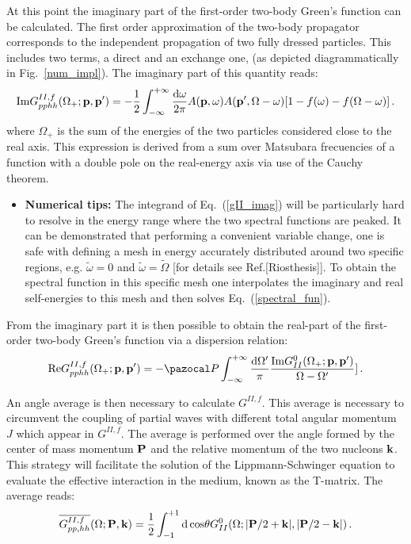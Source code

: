  At this point the imaginary part of the first-order two-body Green's function can be calculated. The first order approximation of the two-body propagator corresponds to the independent propagation of two fully dressed particles. This includes two terms, a direct and an exchange one, (as depicted diagrammatically in Fig.~\ref{num_impl}). The imaginary part of this quantity reads:
\begin{equation}
\label{gII_imag}
{\rm Im}G^{II,f}_{pphh}(\Omega_+;{\bf p},{\bf p'}) = -\frac{1}{2}\int_{-\infty}^{+\infty}\frac{{\rm d}{\omega}}{2\pi}A({\bf p},\omega)A({\bf p'},\Omega-\omega)[1-f(\omega)-f(\Omega-\omega)]\,.
\end{equation}
where $\Omega_+$ is the sum of the energies of the two particles considered close to the real axis. This expression is derived from a sum over Matsubara frecuencies of a function with a double pole on the real-energy axis via use of the Cauchy theorem.
\begin{itemize}
\item {\bf Numerical tips:} The integrand of Eq.~(\ref{gII_imag}) will be particularly hard to resolve in the energy range where the two spectral functions are peaked. It can be demonstrated that performing a convenient variable change, one is safe with defining a mesh in energy accurately distributed around two specific regions, e.g. $\tilde\omega=0$ and $\tilde\omega=\tilde\Omega$ [for details see Ref.[Riosthesis]]. To obtain the spectral function in this specific mesh one interpolates the imaginary and real self-energies to this mesh and then solves Eq.~(\ref{spectral_fun}).
\end{itemize}

 From the imaginary part it is then possible to obtain the real-part of the first-order two-body Green's function via a dispersion relation:
\begin{equation}
{\rm Re}G^{II,f}_{pphh}(\Omega_+;{\bf p},{\bf p'}) = -{\pazocal P}\int_{-\infty}^{+\infty}\frac{{\rm d}{\Omega'}}{\pi}\frac{{\rm Im}G^0_{II}(\Omega_+;{\bf p},{\bf p'})}{\Omega-\Omega'}]\,.
\end{equation}

 An angle average is then necessary to calculate $G^{II,f}$. This average is necessary to circumvent the coupling of partial waves with different total angular momentum $J$ which appear in $G^{II,f}$. The average is performed over the angle formed by the center of mass momentum ${\bf P}$ and the relative momentum of the two nucleons ${\bf k}$. This strategy will facilitate the solution of the Lippmann-Schwinger equation to evaluate the effective interaction in the medium, known as the T-matrix. The average reads:
\begin{equation}
\overline{G^{II,f}_{pp,hh}}(\Omega;{\bf P},{\bf k})=\frac{1}{2}\int_{-1}^{+1}{\rm d\,cos}\theta G^0_{II}(\Omega;|{\bf P}/2+{\bf k}|,|{\bf P}/2-{\bf k}|)\,.
\end{equation}

